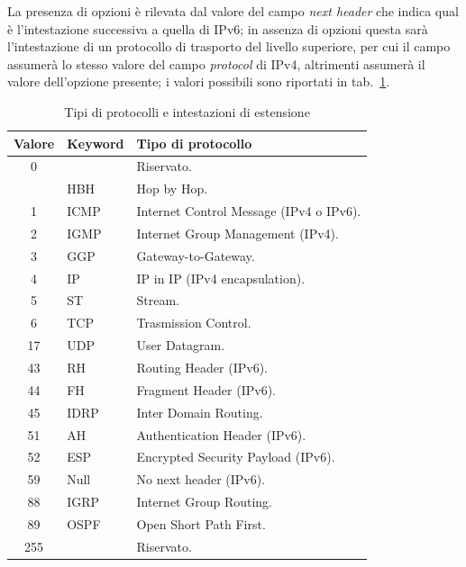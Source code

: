 La presenza di opzioni è rilevata dal valore del campo \textit{next header}
che indica qual è l'intestazione successiva a quella di IPv6; in assenza di
opzioni questa sarà l'intestazione di un protocollo di trasporto del livello
superiore, per cui il campo assumerà lo stesso valore del campo
\textit{protocol} di IPv4, altrimenti assumerà il valore dell'opzione
presente; i valori possibili sono riportati in
tab.~\ref{tab:IP_ipv6_nexthead}.

\begin{table}[htb]
  \begin{center}
    \footnotesize
    \begin{tabular}{|c|l|l|}
      \hline
      \textbf{Valore} & \textbf{Keyword} & \textbf{Tipo di protocollo} \\
      \hline
      \hline
      0  &      & Riservato.\\
         & HBH  & Hop by Hop.\\
      1  & ICMP & Internet Control Message (IPv4 o IPv6).\\
      2  & IGMP & Internet Group Management (IPv4).\\
      3  & GGP  & Gateway-to-Gateway.\\
      4  & IP   & IP in IP (IPv4 encapsulation).\\
      5  & ST   & Stream.\\
      6  & TCP  & Trasmission Control.\\
      17 & UDP  & User Datagram.\\
      43 & RH   & Routing Header (IPv6).\\
      44 & FH   & Fragment Header (IPv6).\\
      45 & IDRP & Inter Domain Routing.\\
      51 & AH   & Authentication Header (IPv6).\\
      52 & ESP  & Encrypted Security Payload (IPv6).\\
      59 & Null & No next header (IPv6).\\
      88 & IGRP & Internet Group Routing.\\
      89 & OSPF & Open Short Path First.\\
      255&      & Riservato.\\
    \hline
    \end{tabular}
    \caption{Tipi di protocolli e intestazioni di estensione}
    \label{tab:IP_ipv6_nexthead}
  \end{center}
\end{table}

